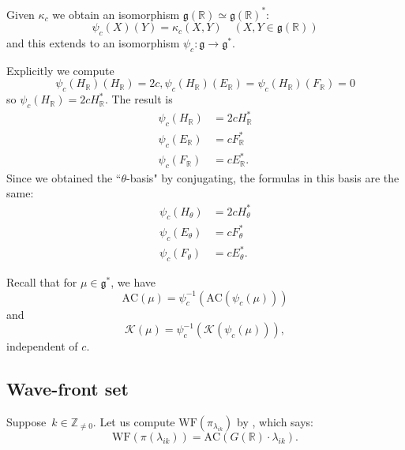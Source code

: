 \documentclass[10pt,leqno]{article}
\numberwithin{equation}{section}
\newcommand{\R}{\mathbb R}
\newcommand{\Z}{\mathbb Z}
\newcommand{\K}{\mathcal K}
\newcommand{\g}{\mathfrak g}
\newcommand{\WF}{\mathrm{WF}}
\newcommand{\AC}{\mathrm{AC}}
\begin{document}
Given $\kappa_c$ we obtain an isomorphism $\g(\R)\simeq \g(\R)^*$:
$$
\psi_c(X)(Y)=\kappa_c(X,Y)\quad (X,Y\in \g(\R))
$$
and this extends to an isomorphism $\psi_c: \g\rightarrow \g^*$. 

Explicitly we compute
$$
\psi_c(H_\R)(H_\R)=2c, \psi_c(H_\R)(E_\R)= \psi_c(H_\R)(F_\R)=0
$$
so  $\psi_c(H_\R)=2cH_\R^*$.
The result is
\begin{equation}
\label{e:psic1}
\begin{aligned}
\psi_c(H_\R)&=2cH_\R^*\\
\psi_c(E_\R)&=cF_\R^*\\
\psi_c(F_\R)&=cE_\R^*.
\end{aligned}
\end{equation}
Since we obtained the ``$\theta$-basis" by conjugating, the formulas in this basis are the same:
\begin{equation}
\label{e:psic2}
\begin{aligned}
\psi_c(H_\theta)&=2cH_\theta^*\\
\psi_c(E_\theta)&=cF_\theta^*\\
\psi_c(F_\theta)&=cE_\theta^*.
\end{aligned}
\end{equation}

Recall that for $\mu\in \g^*$, we have
$$
\AC(\mu)=\psi_c^{-1}(\AC(\psi_c(\mu)))
$$
and
$$
\K(\mu)=\psi_c^{-1}(\K(\psi_c(\mu))),
$$
independent of $c$.







\subsection{Wave-front set}

Suppose~$k \in \Z_{\neq 0}$. Let us compute $\WF(\pi_{\lambda_{ik}})$ by  \cite{HarrisHeOlafsson}, which says:
$$
\WF(\pi(\lambda_{ik}))=\AC(G(\R)\cdot \lambda_{ik}).
$$
\end{document}
